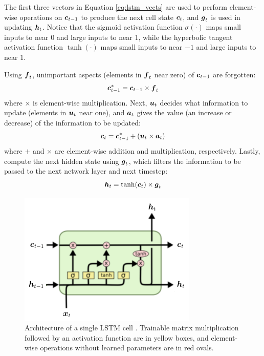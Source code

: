 The first three vectors in Equation \ref{eq:lstm_vects} are used to perform element-wise operations on $\boldsymbol{c}_{t-1}$ to produce the next cell state $\boldsymbol{c}_t$, and $\boldsymbol{g}_t$ is used in updating $\boldsymbol{h}_t$. Notice that the sigmoid activation function $\sigma(\cdot)$ maps small inputs to near $0$ and large inputs to near $1$, while the hyperbolic tangent activation function $\tanh(\cdot)$ maps small inputs to near $-1$ and large inputs to near $1$. 

Using $\boldsymbol{f}_t$, unimportant aspects (elements in $\boldsymbol{f}_t$ near zero) of $\boldsymbol{c}_{t-1}$ are forgotten:
\begin{equation}
  \boldsymbol{c}_{t-1}^* = \boldsymbol{c}_{t-1} \times \boldsymbol{f}_t
  \label{eq:lstm_forget}
\end{equation}
where $\times$ is element-wise multiplication. Next, $\boldsymbol{u}_t$ decides what information to update (elements in $\boldsymbol{u}_t$ near one), and $\boldsymbol{a}_t$ gives the value (an increase or decrease) of the information to be updated:
\begin{equation}
  \boldsymbol{c}_t = \boldsymbol{c}_{t-1}^* + \left( \boldsymbol{u}_t \times \boldsymbol{a}_t \right)
  \label{eq:lstm_update}
\end{equation}
where $+$ and $\times$ are element-wise addition and multiplication, respectively. Lastly, compute the next hidden state using $\boldsymbol{g}_t$, which filters the information to be passed to the next network layer and next timestep:
\begin{equation}
  \boldsymbol{h}_t = \tanh(\boldsymbol{c}_t) \times \boldsymbol{g}_t
  \label{eq:lstm_filter}
\end{equation}

\begin{figure}[h]
  \centering
  \includegraphics[width=.5\textwidth]{img/lstm_visual}
  \caption{Architecture of a single LSTM cell \cite{olah2015}. Trainable matrix multiplication followed by an activation function are in yellow boxes, and element-wise operations without learned parameters are in red ovals.}
  \label{fig:lstm_visual}
\end{figure}


